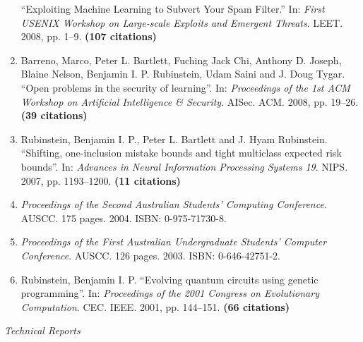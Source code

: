 \documentclass[a4paper,12pt]{article}
\begin{document}
\begin{enumerate}
``Exploiting Machine Learning to Subvert Your Spam Filter.''
In: 
\emph{First USENIX Workshop on Large-scale Exploits and Emergent Threats}.
LEET.
2008, pp. 1--9.
 \textbf{(107 citations)}
\item Barreno, Marco, Peter L. Bartlett, Fuching Jack Chi, Anthony D. Joseph, Blaine Nelson, Benjamin I. P. Rubinstein, Udam Saini and J. Doug Tygar.
``Open problems in the security of learning''.
In: 
\emph{Proceedings of the 1st ACM Workshop on Artificial Intelligence \& Security}.
AISec.
ACM.
2008, pp. 19--26.
 \textbf{(39 citations)}
\item Rubinstein, Benjamin I. P., Peter L. Bartlett and J. Hyam Rubinstein.
``Shifting, one-inclusion mistake bounds and tight multiclass expected risk bounds''.
In: 
\emph{Advances in Neural Information Processing Systems 19}.
NIPS.
2007, pp. 1193--1200.
 \textbf{(11 citations)}
\item \emph{Proceedings of the Second Australian Students' Computing Conference}.
AUSCC.
175 pages.
2004.
ISBN: 0-975-71730-8.

\item \emph{Proceedings of the First Australian Undergraduate Students' Computer Conference}.
AUSCC.
126 pages.
2003.
ISBN: 0-646-42751-2.

\item Rubinstein, Benjamin I. P.
``Evolving quantum circuits using genetic programming''.
In: 
\emph{Proceedings of the 2001 Congress on Evolutionary Computation}.
CEC.
IEEE.
2001, pp. 144--151.
 \textbf{(66 citations)}

\setcounter{list}{\value{enumi}}
\end{enumerate}

\noindent\textit{Technical Reports}
\end{document}
